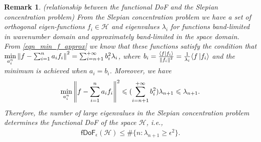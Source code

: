 \documentclass[12pt,draftclsnofoot,journal,onecolumn]{IEEEtran}
\newtheorem{remark}{Remark}
\begin{document}
		\begin{remark}
		(relationship between the functional DoF and the Slepian concentration problem) From the Slepian concentration problem we have a set of orthogonal eigen-functions $f_i \in \mathcal{H}$ and eigenvalues $\lambda_i$ for functions band-limited in wavenumber domain and approximately band-limited in the space domain. From \eqref{eqn_min_f_approx} we know that these functions satisfy the condition that $\underset{a_i^n}{\rm min}\left\| f- \sum_{i=1}^n a_i f_i    \right\|^2 = \sum_{i=n+1}^{+\infty}b_i^2 \lambda_i $, where $b_i =\frac{ \langle f \ket{f_i}}{\left\| f_i \right\|^2}= \frac{1}{\lambda_i} \langle f \ket{f_i}$ and the minimum is achieved when $a_i=b_i$. Moreover, we have
		\begin{equation}
			\begin{aligned}
				\underset{a_i^n}{\rm min}\left\| f- \sum_{i=1}^n a_i f_i    \right\|^2	\leqslant (\sum_{i=n+1}^{+\infty}b_i^2) \lambda_{n+1} \leqslant \lambda_{n+1}.
			\end{aligned}
		\end{equation}  
		Therefore, the number of large eigenvalues in the Slepian concentration problem determines the functional DoF of the space $\mathcal{H}$, i.e.,
		\begin{equation}
			\begin{aligned}
				\mathsf{fDoF}_{\epsilon} (\mathcal{H}) \leqslant \#\{n: \lambda_{n+1} \geqslant \epsilon^2\}.
			\end{aligned}
		\end{equation} 
	\end{remark}
	
\end{document}
